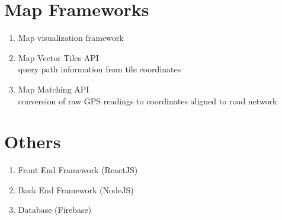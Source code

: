 \section{Map Frameworks}
\begin{enumerate}
    \item Map visualization framework
    \item Map Vector Tiles API \\
    query path information from tile coordinates
    \item Map Matching API \\
    conversion of raw GPS readings to coordinates aligned to road network
\end{enumerate}

\section{Others}
\begin{enumerate}
    \item Front End Framework (ReactJS)
    \item Back End Framework (NodeJS)
    \item Database (Firebase)
\end{enumerate}
